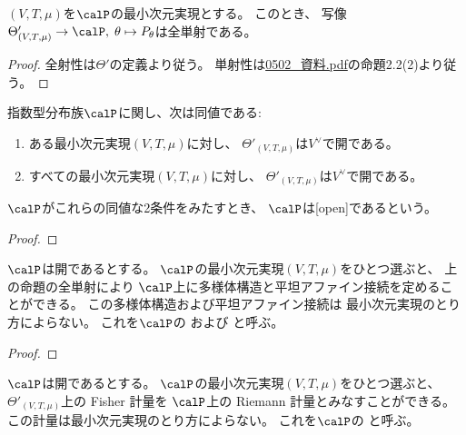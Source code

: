 \documentclass[report]{jlreq}
\begin{document}
\begin{proposition}
    $(V, T, \mu)$を$\calP$の最小次元実現とする。
    このとき、
    写像$\Theta'_{(V, T, \mu)} \to \calP, \;
        \theta \mapsto P_\theta$は全単射である。
\end{proposition}

\begin{proof}
    全射性は$\Theta'$の定義より従う。
    単射性は\url{0502_資料.pdf}の命題2.2(2)より従う。
\end{proof}

\begin{propdef}
    指数型分布族$\calP$に関し、次は同値である:
    \begin{enumerate}
        \item ある最小次元実現$(V, T, \mu)$に対し、
            $\Theta'_{(V, T, \mu)}$は$V^\vee$で開である。
        \item すべての最小次元実現$(V, T, \mu)$に対し、
            $\Theta'_{(V, T, \mu)}$は$V^\vee$で開である。
    \end{enumerate}
    $\calP$がこれらの同値な2条件をみたすとき、
    $\calP$は[open]であるという。
\end{propdef}

\begin{proof}
    \TODO{}
\end{proof}

\begin{propdef}
    $\calP$は開であるとする。
    $\calP$の最小次元実現$(V, T, \mu)$をひとつ選ぶと、
    上の命題の全単射により
    $\calP$上に多様体構造と平坦アファイン接続を定めることができる。
    この多様体構造および平坦アファイン接続は
    最小次元実現のとり方によらない。
    これを$\calP$の
    および
    と呼ぶ。
\end{propdef}

\begin{proof}
\end{proof}

\begin{propdef}
    $\calP$は開であるとする。
    $\calP$の最小次元実現$(V, T, \mu)$をひとつ選ぶと、
    $\Theta'_{(V, T, \mu)}$上の Fisher 計量を
    $\calP$上の Riemann 計量とみなすことができる。
    この計量は最小次元実現のとり方によらない。
    これを$\calP$の
    と呼ぶ。
\end{propdef}
\end{document}
